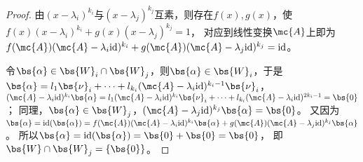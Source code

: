 \documentclass[12pt, a4paper, oneside, UTF8]{ctexbook}
\begin{document}
\begin{proof}
    由$(x-\lambda_i)^{k_i}$与$(x-\lambda_j)^{k_j}$互素，则存在$f(x),g(x)$，使$f(x)(x-\lambda_i)^{k_i}+g(x)(x-\lambda_j)^{k_j}=1$，
    对应到线性变换$\mc{A}$上即为$f(\mc{A})(\mc{A}-\lambda_i\mathrm{id})^{k_i}+g(\mc{A})(\mc{A}-\lambda_j\mathrm{id})^{k_j}=\mathrm{id}$。
    
    令$\bs{\alpha} \in \bs{W}_i \cap \bs{W}_j$，则$\bs{\alpha} \in \bs{W}_i$，于是$\bs{\alpha}=l_1\bs{\nu}_i+\cdots+l_{k_i}(\mc{A}-\lambda_i\mathrm{id})^{k_i-1}\bs{\nu}_i$，
    $(\mc{A}-\lambda_i\mathrm{id})^{k_i}\bs{\alpha}=l_1(\mc{A}-\lambda_i\mathrm{id})^{k_i} \bs{\nu}_i+\cdots+l_{k_i}(\mc{A}-\lambda_i\mathrm{id})^{2k_i-1}=\bs{0}$；
    同理，$\bs{\alpha} \in \bs{W}_j$，$(\mc{A}-\lambda_j\mathrm{id})^{k_j}\bs{\alpha}=\bs{0}$。
    又因为$\bs{\alpha}=\mathrm{id}(\bs{\alpha})=f(\mc{A})(\mc{A}-\lambda_i\mathrm{id})^{k_i}\bs{\alpha}+g(\mc{A})(\mc{A}-\lambda_j\mathrm{id})^{k_j}\bs{\alpha}$。
    所以$\bs{\alpha}=\mathrm{id}(\bs{\alpha})=\bs{0}+\bs{0}=\bs{0}$，
    即$\bs{W} \cap \bs{W}_j =\{\bs{0}\}$。

\end{proof}
\ifx\allfiles\undefined
\end{document}
